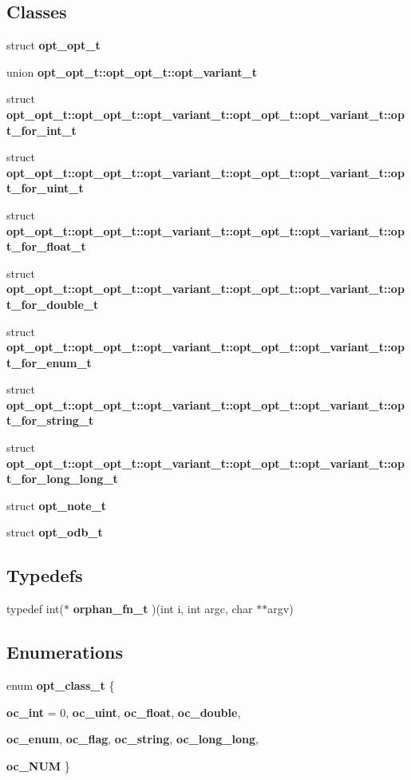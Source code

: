 \subsection*{Classes}
\begin{CompactItemize}
\item 
struct {\bf opt\_\-opt\_\-t}
\item 
union {\bf opt\_\-opt\_\-t::opt\_\-opt\_\-t::opt\_\-variant\_\-t}
\item 
struct {\bf opt\_\-opt\_\-t::opt\_\-opt\_\-t::opt\_\-variant\_\-t::opt\_\-opt\_\-t::opt\_\-variant\_\-t::opt\_\-for\_\-int\_\-t}
\item 
struct {\bf opt\_\-opt\_\-t::opt\_\-opt\_\-t::opt\_\-variant\_\-t::opt\_\-opt\_\-t::opt\_\-variant\_\-t::opt\_\-for\_\-uint\_\-t}
\item 
struct {\bf opt\_\-opt\_\-t::opt\_\-opt\_\-t::opt\_\-variant\_\-t::opt\_\-opt\_\-t::opt\_\-variant\_\-t::opt\_\-for\_\-float\_\-t}
\item 
struct {\bf opt\_\-opt\_\-t::opt\_\-opt\_\-t::opt\_\-variant\_\-t::opt\_\-opt\_\-t::opt\_\-variant\_\-t::opt\_\-for\_\-double\_\-t}
\item 
struct {\bf opt\_\-opt\_\-t::opt\_\-opt\_\-t::opt\_\-variant\_\-t::opt\_\-opt\_\-t::opt\_\-variant\_\-t::opt\_\-for\_\-enum\_\-t}
\item 
struct {\bf opt\_\-opt\_\-t::opt\_\-opt\_\-t::opt\_\-variant\_\-t::opt\_\-opt\_\-t::opt\_\-variant\_\-t::opt\_\-for\_\-string\_\-t}
\item 
struct {\bf opt\_\-opt\_\-t::opt\_\-opt\_\-t::opt\_\-variant\_\-t::opt\_\-opt\_\-t::opt\_\-variant\_\-t::opt\_\-for\_\-long\_\-long\_\-t}
\item 
struct {\bf opt\_\-note\_\-t}
\item 
struct {\bf opt\_\-odb\_\-t}
\end{CompactItemize}
\subsection*{Typedefs}
\begin{CompactItemize}
\item 
typedef int($\ast$ {\bf orphan\_\-fn\_\-t} )(int i, int argc, char $\ast$$\ast$argv)
\end{CompactItemize}
\subsection*{Enumerations}
\begin{CompactItemize}
\item 
enum {\bf opt\_\-class\_\-t} \{ \par
{\bf oc\_\-int} =  0, 
{\bf oc\_\-uint}, 
{\bf oc\_\-float}, 
{\bf oc\_\-double}, 
\par
{\bf oc\_\-enum}, 
{\bf oc\_\-flag}, 
{\bf oc\_\-string}, 
{\bf oc\_\-long\_\-long}, 
\par
{\bf oc\_\-NUM}
 \}
\end{CompactItemize}
